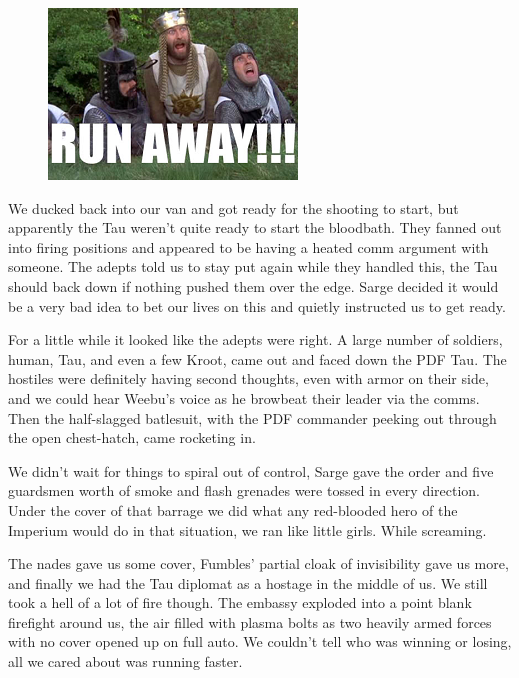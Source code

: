 \begin{figure}
	\begin{center}
		\includegraphics[width=\figwidth]{pics/10/72.png}
	\end{center}
\end{figure}
We ducked back into our van and got ready for the shooting to start, but apparently the Tau weren't quite ready to start the bloodbath. 
They fanned out into firing positions and appeared to be having a heated comm argument with someone. 
The adepts told us to stay put again while they handled this, the Tau should back down if nothing pushed them over the edge. 
Sarge decided it would be a very bad idea to bet our lives on this and quietly instructed us to get ready.
 
For a little while it looked like the adepts were right. 
A large number of soldiers, human, Tau, and even a few Kroot, came out and faced down the PDF Tau. 
The hostiles were definitely having second thoughts, even with armor on their side, and we could hear Weebu’s voice as he browbeat their leader via the comms. 
Then the half-slagged batlesuit, with the PDF commander peeking out through the open chest-hatch, came rocketing in.
 
We didn’t wait for things to spiral out of control, Sarge gave the order and five guardsmen worth of smoke and flash grenades were tossed in every direction. 
Under the cover of that barrage we did what any red-blooded hero of the Imperium would do in that situation, we ran like little girls. 
While screaming.
 
The nades gave us some cover, Fumbles’ partial cloak of invisibility gave us more, and finally we had the Tau diplomat as a hostage in the middle of us. 
We still took a hell of a lot of fire though. 
The embassy exploded into a point blank firefight around us, the air filled with plasma bolts as two heavily armed forces with no cover opened up on full auto. 
We couldn’t tell who was winning or losing, all we cared about was running faster.

